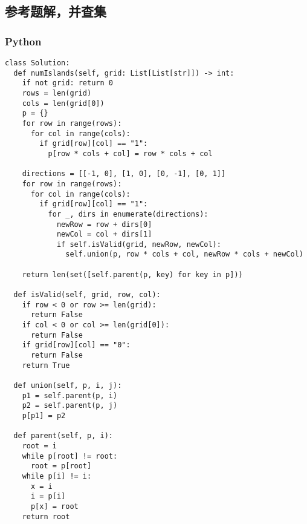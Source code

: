\subsection{参考题解，并查集}

\subsubsection{Python}

\begin{verbatim}
class Solution:
  def numIslands(self, grid: List[List[str]]) -> int:
    if not grid: return 0
    rows = len(grid)
    cols = len(grid[0])
    p = {}
    for row in range(rows):
      for col in range(cols):
        if grid[row][col] == "1":
          p[row * cols + col] = row * cols + col

    directions = [[-1, 0], [1, 0], [0, -1], [0, 1]]
    for row in range(rows):
      for col in range(cols):
        if grid[row][col] == "1":
          for _, dirs in enumerate(directions):
            newRow = row + dirs[0]
            newCol = col + dirs[1]
            if self.isValid(grid, newRow, newCol):
              self.union(p, row * cols + col, newRow * cols + newCol)

    return len(set([self.parent(p, key) for key in p]))

  def isValid(self, grid, row, col):
    if row < 0 or row >= len(grid):
      return False
    if col < 0 or col >= len(grid[0]):
      return False
    if grid[row][col] == "0":
      return False
    return True

  def union(self, p, i, j):
    p1 = self.parent(p, i)
    p2 = self.parent(p, j)
    p[p1] = p2

  def parent(self, p, i):
    root = i
    while p[root] != root:
      root = p[root]
    while p[i] != i:
      x = i
      i = p[i]
      p[x] = root
    return root
\end{verbatim}
